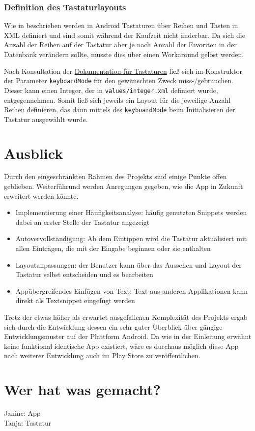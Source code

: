 \documentclass[11pt]{article}
\begin{document}
	\subsubsection{Definition des Tastaturlayouts}
	Wie in  beschrieben werden in Android Tastaturen über Reihen und Tasten in XML definiert und sind somit während der Kaufzeit nicht änderbar. Da sich die Anzahl der Reihen auf der Tastatur aber je nach Anzahl der Favoriten in der Datenbank verändern sollte, musste dies über einen Workaround gelöst werden. \newline
	
	\noindent Nach Konsultation der \href{https://developer.android.com/reference/android/inputmethodservice/Keyboard}{Dokumentation für Tastaturen} ließ sich im Konstruktor der Parameter \texttt{keyboardMode} für den gewünschten Zweck miss-/gebrauchen. Dieser kann einen Integer, der in \texttt{values/integer.xml} definiert wurde, entgegennehmen. Somit ließ sich jeweils ein Layout für die jeweilige Anzahl Reihen definieren, das dann mittels des \texttt{keyboardMode} beim Initialisieren der Tastatur ausgewählt wurde.
	
	\section{Ausblick}
	Durch den eingeschränkten Rahmen des Projekts sind einige Punkte offen geblieben. Weiterführund werden Anregungen gegeben, wie die App in Zukunft erweitert werden könnte.
	\begin{itemize}
		\item Implementierung einer Häufigkeitsanalyse: häufig genutzten Snippets werden dabei an erster Stelle der Tastatur angezeigt
		\item Autovervollständigung: Ab dem Eintippen wird die Tastatur aktualisiert mit allen Einträgen, die mit der Eingabe beginnen oder sie enthalten
		\item Layoutanpassungen: der Benutzer kann über das Aussehen und Layout der Tastatur selbst entscheiden und es bearbeiten
		\item Appübergreifendes Einfügen von Text: Text aus anderen Applikationen kann direkt als Textsnippet eingefügt werden
	\end{itemize}
	Trotz der etwas höher als erwartet ausgefallenen Komplexität des Projekts ergab sich durch die Entwicklung dessen ein sehr guter Überblick über gängige Entwicklungsmuster auf der Plattform Android. Da wie in der Einleitung erwähnt keine funktional identische App existiert, wäre es durchaus möglich diese App nach weiterer Entwicklung auch im Play Store zu veröffentlichen.
	
	
	\section{Wer hat was gemacht?}
	Janine: App\\
	Tanja: Tastatur
\end{document}
